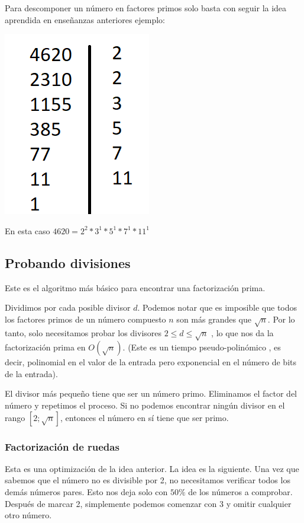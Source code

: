 Para descomponer un número en factores primos solo basta con seguir la idea aprendida en enseñanzas anteriores ejemplo:

\includegraphics[scale=0.4]{img/descomposicion_primos}

En esta caso $4620=2^{2}*3^{1}*5^{1}*7^{1}*11^{1}$


\subsection{Probando divisiones}

Este es el algoritmo más básico para encontrar una factorización prima.

Dividimos por cada posible divisor $d$. Podemos notar que es imposible que todos los factores primos 
de un número compuesto $n$ son más grandes que $\sqrt{n}$. Por lo tanto, solo necesitamos probar los 
divisores $2 \le d \le \sqrt{n}$ , lo que nos da la factorización prima en $O(\sqrt{n})$. (Este es un 
tiempo pseudo-polinómico , es decir, polinomial en el valor de la entrada pero exponencial en el 
número de bits de la entrada).

El divisor más pequeño tiene que ser un número primo. Eliminamos el factor del número y repetimos el 
proceso. Si no podemos encontrar ningún divisor en el rango $[2; \sqrt{n}]$, entonces el número en sí 
tiene que ser primo.

\subsubsection{Factorización de ruedas}

Esta es una optimización de la idea anterior. La idea es la siguiente. Una vez que sabemos que el número no es divisible por 2, no necesitamos verificar todos los demás números pares. Esto nos deja solo con $50\%$ de los números a comprobar. Después de marcar 2, simplemente podemos comenzar con 3 y omitir cualquier otro número.


